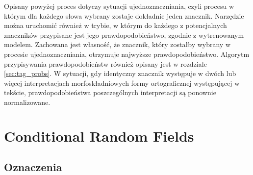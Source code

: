 \documentclass[a4paper,10]{article}
\begin{document}
Opisany powyżej proces dotyczy sytuacji ujednoznaczniania, czyli procesu w którym
dla każdego słowa wybrany zostaje dokładnie jeden znacznik.
Narzędzie można uruchomić również w trybie, w którym do każdego
z potencjalnych znaczników przypisane jest jego prawdopodobieństwo,
zgodnie z wytrenowanym modelem. Zachowana jest własność, że znacznik, który
zostałby wybrany w procesie ujednoznaczniania, otrzymuje najwyższe
prawdopodobieństwo. Algorytm przypisywania prawdopodobieństw
również opisany jest w rozdziale \ref{sec:tag_probs}.
W sytuacji, gdy identyczny znacznik występuje w dwóch lub więcej
interpretacjach morfoskładniowych formy ortograficznej występującej
w tekście, prawdopodobieństwa poszczególnych interpretacji są
ponownie normalizowane.

\section{Conditional Random Fields}

\subsection{Oznaczenia}
\end{document}
